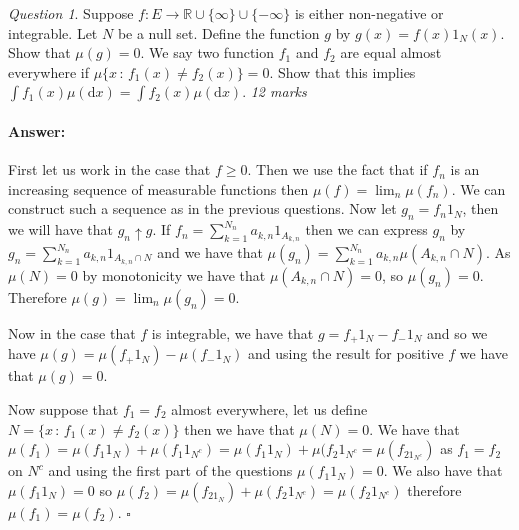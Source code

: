 \documentclass[11pt]{article}
\theoremstyle{definition}
\theoremstyle{remark}
\newtheorem{q}[thm]{Question}
\newenvironment{ans}{\paragraph{Answer:}}{\hfill$\square$ \vspace{10pt}}
\begin{document}
\begin{q}
Suppose $f: E \rightarrow \mathbb{R}\cup\{\infty\}\cup\{-\infty\}$ is either non-negative or integrable. Let $N$ be a null set. Define the function $g$ by $g(x) = f(x)1_N(x)$. Show that $\mu(g) = 0$. We say two function $f_1$ and $f_2$ are equal almost everywhere if $\mu\{x\,:\, f_1(x) \neq f_2(x)\} = 0$. Show that this implies $\int f_1(x) \mu(\mathrm{d}x) = \int f_2(x) \mu(\mathrm{d}x)$. \emph{12 marks}
\end{q}
\begin{ans}
First let us work in the case that $f \geq 0$. Then we use the fact that if $f_n$ is an increasing sequence of measurable functions then $\mu(f) = \lim_n \mu(f_n)$. We can construct such a sequence as in the previous questions. Now let $g_n = f_n1_N$, then we will have that $g_n \uparrow g$. If $f_n = \sum_{k=1}^{N_n} a_{k,n} 1_{A_{k,n}}$ then we can express $g_n$ by $g_n = \sum_{k=1}^{N_n} a_{k,n}1_{A_{k,n} \cap N}$ and we have that $\mu(g_n) = \sum_{k=1}^{N_n} a_{k,n} \mu(A_{k,n} \cap N)$. As $\mu(N) = 0$ by monotonicity we have that $\mu(A_{k,n} \cap N) = 0$, so $\mu(g_n) = 0$. Therefore $\mu(g) = \lim_n \mu(g_n) = 0$. 

Now in the case that $f$ is integrable, we have that $g = f_+1_N - f_- 1_N$ and so we have $\mu(g) = \mu(f_+1_N) - \mu(f_- 1_N)$ and using the result for positive $f$ we have that $\mu(g) = 0$.

Now suppose that $f_1 = f_2$ almost everywhere, let us define $N = \{ x \,:\, f_1(x) \neq f_2(x)\}$ then we have that $\mu(N) = 0$. We have that $\mu(f_1) = \mu(f_1 1_N) + \mu(f_1 1_{N^c}) = \mu(f_1 1_N) + \mu(f_2 1_{N^c} = \mu(f_21_{N^c})$ as $f_1 = f_2$ on $N^c$ and using the first part of the questions $\mu(f_1 1_N) = 0$. We also have that $\mu(f_1 1_N) = 0$ so $\mu(f_2) = \mu(f_21_N) + \mu(f_2 1_{N^c}) = \mu(f_2 1_{N^c})$ therefore $\mu(f_1) = \mu(f_2)$. 
\end{ans}
\end{document}

